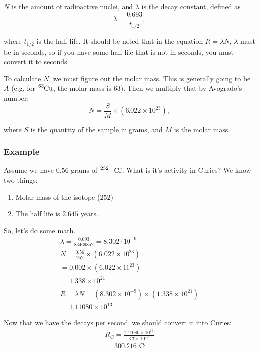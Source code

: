 \documentclass{article}
\begin{document}
\begin{multicols*}{2}
    $N$ is the amount of radioactive nuclei, and $\lambda$ is the decay constant, defined as
    \[
      \lambda = \frac{0.693}{t_{1/2}},
    \]

    where $t_{1/2}$ is the half-life. It should be noted that in the equation $R=\lambda{N}$,
    $\lambda$ must be in seconds, so if you have some half life that is not in seconds, you
    must convert it to seconds.

    To calculate $N$, we must figure out the molar mass. This is generally going to be $A$ (e.g.
    for $\ce{^{63}Cu}$, the molar mass is $63$). Then we multiply that by Avogrado's number:
    \[
      N = \frac{S}{M} \times \left(6.022 \times 10^{23}\right),
    \]

    where $S$ is the quantity of the sample in grams, and $M$ is the molar mass.

    \subsubsection{Example}
    Assume we have $0.56$ grams of $\ce{^{252}-Cf}$. What is it's activity in Curies? We know
    two things:
    \begin{enumerate}
      \item Molar mass of the isotope ($252$)
      \item The half life is $2.645$ years.
    \end{enumerate}

    So, let's do some math.
    \begin{equation*}
      \begin{split}
        \lambda = \frac{0.693}{83469852} = 8.302 \cdot 10^{-9} \\
        N = \frac{0.56}{252} \times \left(6.022 \times 10^{23}\right) \\
          = 0.002 \times \left(6.022 \times 10^{23}\right) \\
          = 1.338\times 10^{21}\\
        \\
        R = \lambda{N} = (8.302 \times 10^{-9}) \times (1.338 \times 10^{21}) \\
        = \boxed{1.11080 \times 10^{13}}
      \end{split}
    \end{equation*}

    Now that we have the decays per second, we should convert it into Curies:
    \begin{equation*}
      \begin{split}
        R_C = \frac{1.11080 \times 10^{13}}{3.7\times{10^{10}}} \\
        = \boxed{300.216 \text{ Ci}}
      \end{split}
    \end{equation*}

\end{multicols*}
\end{document}
